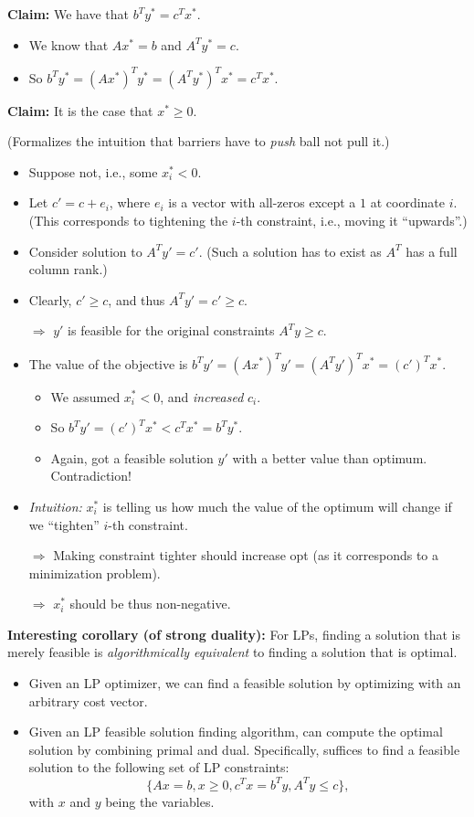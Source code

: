 \documentclass{article}
\begin{document}
{\bf Claim:} We have that $b^Ty^*=c^Tx^*$.
\begin{itemize}
\item We know that $Ax^*=b$ and $A^Ty^*=c$. 
\item So $b^Ty^*=(Ax^*)^Ty^*=(A^Ty^*)^Tx^*=c^Tx^*$.
\end{itemize}

{\bf Claim:} It is the case that $x^* \ge 0$.

(Formalizes the intuition that barriers have to \emph{push} ball not pull it.)
\begin{itemize}
\item  Suppose not, i.e., some $x_i^* < 0$.
\item Let $c'=c+e_i$, where $e_i$ is a vector with all-zeros except a $1$ at coordinate $i$. (This corresponds to tightening the $i$-th constraint, i.e., moving it ``upwards''.)
\item Consider solution to $A^T y'=c'$. (Such a solution has to exist as $A^T$ has a full column rank.)
\item Clearly, $c' \ge c$, and thus $A^Ty'=c'\geq c$. 

$\Rightarrow$ $y'$ is feasible for the original constraints $A^Ty\ge c$. 
\item The value of the objective is $b^Ty'=(Ax^*)^Ty'=(A^Ty')^Tx^*=(c')^Tx^*$.
\begin{itemize}
\item We assumed $x_i^* < 0$, and \emph{increased} $c_i$.
\item So $b^Ty'=(c')^Tx^* < c^Tx^* =b^Ty^*$.
\item Again, got a feasible solution $y'$ with a better value than optimum. Contradiction!
\end{itemize}
\item {\em Intuition:} $x_i^*$ is telling us how much the value of the optimum will change if we ``tighten'' $i$-th constraint.

$\Rightarrow$ Making constraint tighter should increase opt (as it corresponds to a minimization problem).

$\Rightarrow$ $x_i^*$ should be thus non-negative.
\end{itemize}

{\bf Interesting corollary (of strong duality):} For LPs, finding a solution that is merely feasible is {\em algorithmically equivalent} to finding a solution that is optimal. 
\begin{itemize}
\item Given an LP optimizer, we can find a feasible solution by optimizing with an arbitrary cost vector.
\item Given an LP feasible  solution finding algorithm, can compute the optimal solution by combining primal and dual. Specifically, suffices to find a feasible solution to the following set of LP constraints:
  \[
  \{ Ax=b, x\geq 0, c^Tx=b^Ty,  A^Ty\leq c\},
  \]
  with $x$ and $y$ being the variables. 
\end{itemize}
\end{document}
